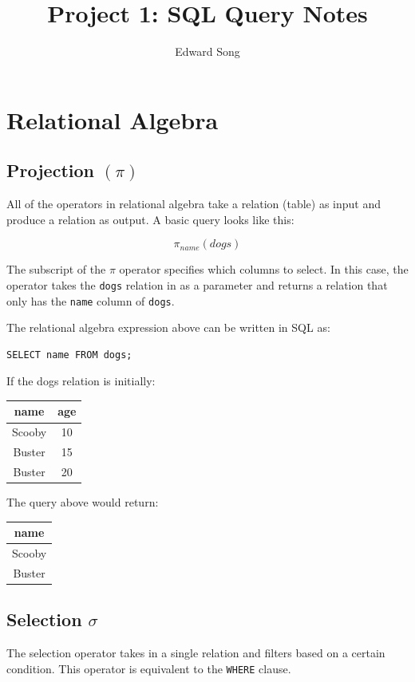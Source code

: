 \documentclass{article}
\begin{document}
\title{Project 1: SQL Query Notes}
\author{Edward Song}
\maketitle
\thispagestyle{empty}

\section{Relational Algebra}

\subsection{Projection $(\pi)$}
All of the operators in relational algebra take a relation (table) as input and produce a relation as output. A basic query looks like this:

\[
\pi_{name}(dogs)
\]

The subscript of the $\pi$ operator specifies which columns to select. In this case, the operator takes the \texttt{dogs} relation in as a parameter and returns a relation that only has the \texttt{name} column of \texttt{dogs}.

The relational algebra expression above can be written in SQL as:
\begin{lstlisting}
SELECT name FROM dogs;
\end{lstlisting}

If the dogs relation is initially:

\begin{center}
\begin{tabular}{|c|c|}
\hline
\textbf{name} & \textbf{age} \\
\hline
Scooby & 10 \\
Buster & 15 \\
Buster & 20 \\
\hline
\end{tabular}
\end{center}

The query above would return:
\begin{center}
\begin{tabular}{|c|}
\hline
\textbf{name} \\
\hline
Scooby \\
Buster \\
\hline
\end{tabular}
\end{center}

\subsection{Selection $\sigma$}
The selection operator takes in a single relation and filters based on a certain condition. This operator is equivalent to the \texttt{WHERE} clause.
\end{document}
